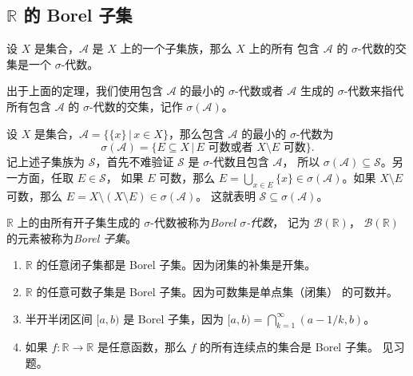 \documentclass[fontset=none]{Notes}
\begin{document}
\subsection{$\mathbb{R}$ 的 Borel 子集}

\begin{theorem}
  设 $X$ 是集合，$\mathcal{A}$ 是 $X$ 上的一个子集族，那么 $X$ 上的所有
  包含 $\mathcal{A}$ 的 $\sigma$-代数的交集是一个 $\sigma$-代数。
\end{theorem}

出于上面的定理，我们使用包含 $\mathcal{A}$ 的最小的 $\sigma$-代数或者
$\mathcal{A}$ 生成的 $\sigma$-代数来指代
所有包含 $\mathcal{A}$ 的 $\sigma$-代数的交集，记作 $\sigma(\mathcal{A})$。

\begin{example}
  设 $X$ 是集合，$\mathcal{A}=\{\{x\}\,|\, x\in X\}$，那么包含 $\mathcal{A}$
  的最小的 $\sigma$-代数为
  \[
    \sigma(\mathcal{A})=\{E\subseteq X\,|\, \text{$E$ 可数或者 $X\setminus E$ 可数}\}.
  \]
  记上述子集族为 $\mathcal{S}$，首先不难验证 $\mathcal{S}$ 是 $\sigma$-代数且包含 $\mathcal{A}$，
  所以 $\sigma(\mathcal{A})\subseteq \mathcal{S}$。另一方面，任取 $E\in \mathcal{S}$，
  如果 $E$ 可数，那么 $E=\bigcup_{x\in E}\{x\}\in \sigma(\mathcal{A})$。如果
  $X\setminus E$ 可数，那么 $E=X\setminus (X\setminus E)\in \sigma(\mathcal{A})$。
  这就表明 $\mathcal{S}\subseteq \sigma(\mathcal{A})$。
\end{example}

\begin{definition}
  $\mathbb{R}$ 上的由所有开子集生成的 $\sigma$-代数被称为\emph{Borel $\sigma$-代数}，
  记为 $\mathcal{B}(\mathbb{R})$，
  $\mathcal{B}(\mathbb{R})$ 的元素被称为\emph{Borel 子集}。
\end{definition}

\begin{example}
  \mbox{}
  \begin{enumerate}
    \item $\mathbb{R}$ 的任意闭子集都是 Borel 子集。因为闭集的补集是开集。
    \item $\mathbb{R}$ 的任意可数子集是 Borel 子集。因为可数集是单点集（闭集）
    的可数并。
    \item 半开半闭区间 $[a,b)$ 是 Borel 子集，因为 $[a,b)=\bigcap_{k=1}^\infty (a-1/k,b)$。
    \item 如果 $f:\mathbb{R}\to \mathbb{R}$ 是任意函数，那么 $f$ 的所有连续点的集合是 Borel 子集。
    见习题。
  \end{enumerate}
\end{example}
\end{document}
